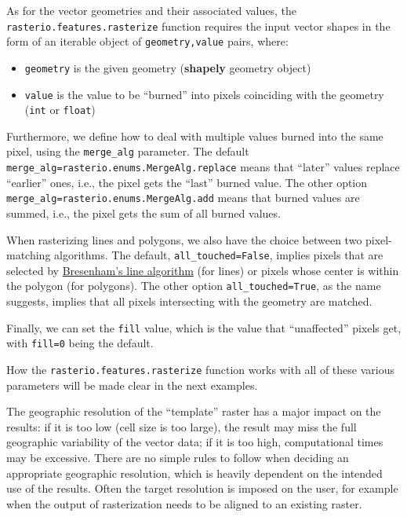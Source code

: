 \documentclass[
  letterpaper,
]{krantz}
\providecommand{\tightlist}{%
  \setlength{\itemsep}{0pt}\setlength{\parskip}{0pt}}\usepackage{longtable,booktabs,array}
\begin{document}
As for the vector geometries and their associated values, the
\texttt{rasterio.features.rasterize} function requires the input vector
shapes in the form of an iterable object of \texttt{geometry,value}
pairs, where:

\begin{itemize}
\tightlist
\item
  \texttt{geometry} is the given geometry (\textbf{shapely} geometry
  object)
\item
  \texttt{value} is the value to be ``burned'' into pixels coinciding
  with the geometry (\texttt{int} or \texttt{float})
\end{itemize}

Furthermore, we define how to deal with multiple values burned into the
same pixel, using the \texttt{merge\_alg} parameter. The default
\texttt{merge\_alg=rasterio.enums.MergeAlg.replace} means that ``later''
values replace ``earlier'' ones, i.e., the pixel gets the ``last''
burned value. The other option
\texttt{merge\_alg=rasterio.enums.MergeAlg.add} means that burned values
are summed, i.e., the pixel gets the sum of all burned values.

When rasterizing lines and polygons, we also have the choice between two
pixel-matching algorithms. The default, \texttt{all\_touched=False},
implies pixels that are selected by
\href{https://en.wikipedia.org/wiki/Bresenham\%27s_line_algorithm}{Bresenham's
line algorithm} (for lines) or pixels whose center is within the polygon
(for polygons). The other option \texttt{all\_touched=True}, as the name
suggests, implies that all pixels intersecting with the geometry are
matched.

Finally, we can set the \texttt{fill} value, which is the value that
``unaffected'' pixels get, with \texttt{fill=0} being the default.

How the \texttt{rasterio.features.rasterize} function works with all of
these various parameters will be made clear in the next examples.

The geographic resolution of the ``template'' raster has a major impact
on the results: if it is too low (cell size is too large), the result
may miss the full geographic variability of the vector data; if it is
too high, computational times may be excessive. There are no simple
rules to follow when deciding an appropriate geographic resolution,
which is heavily dependent on the intended use of the results. Often the
target resolution is imposed on the user, for example when the output of
rasterization needs to be aligned to an existing raster.
\end{document}
